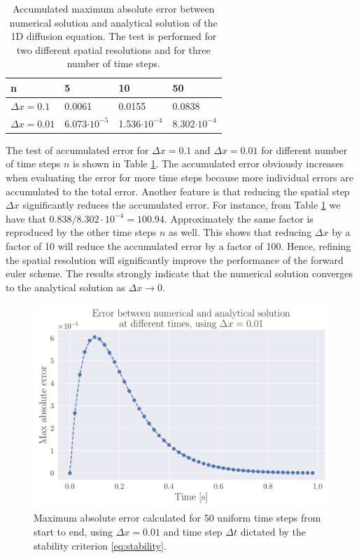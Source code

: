 \documentclass[12pt]{extarticle}
\begin{document}
\begin{table}[h]
	\centering
	\begin{tabular}{|l|l|l|l|}
		\hline
		\textbf{n}      & \textbf{5} & \textbf{10} & \textbf{50} \\ \hline
		$\Delta x=0.1$  & 0.0061     & 0.0155       & 0.0838       \\ \hline
		$\Delta x=0.01$ & 6.073$\cdot 10^{-5}$      & 1.536$\cdot 10^{-4}$       &   8.302$\cdot 10^{-4}$     \\ \hline
	\end{tabular}
\caption{Accumulated maximum absolute error between numerical solution and analytical solution of the 1D diffusion equation. The test is performed for two different spatial resolutions and for three number of time steps.}
\label{tab:errors}
\end{table}

The test of accumulated error for $\Delta x=0.1$ and $\Delta x=0.01$ for different number of time steps $n$ is shown in Table \ref{tab:errors}. The accumulated error obviously increases when evaluating the error for more time steps because more individual errors are accumulated to the total error. Another feature is that reducing the spatial step $\Delta x$ significantly reduces the accumulated error. For instance, from Table \ref{tab:errors} we have that $0.838/8.302\cdot 10^{-4}=100.94$. Approximately the same factor is reproduced by the other time steps $n$ as well. This shows that reducing $\Delta x$ by a factor of 10 will reduce the accumulated error by a factor of 100. Hence, refining the spatial resolution will significantly improve the performance of the forward euler scheme. The results strongly indicate that the numerical solution converges to the analytical solution as $\Delta x \rightarrow 0$. 

\begin{figure}[h]
	\centering
	\includegraphics[scale=0.5]{../output/plots/error_FE}
	\caption{Maximum absolute error calculated for 50 uniform time steps from start to end, using $\Delta x=0.01$ and time step $\Delta t$ dictated by the stability criterion \ref{eq:stability}.}
	\label{fig:error_dx001_n50}
\end{figure}
\end{document}
